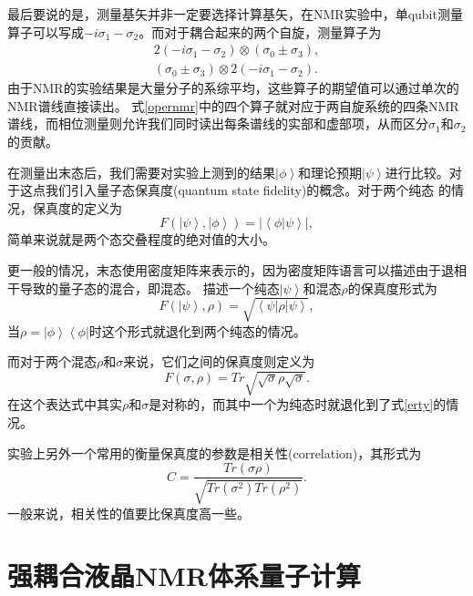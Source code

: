 最后要说的是，测量基矢并非一定要选择计算基矢，在NMR实验中，单qubit测量算子可以写成$-i\sigma_1 - \sigma_2$。而对于耦合起来的两个自旋，测量算子为
\begin{eqnarray}\label{opernmr}
2(-i\sigma_1 - \sigma_2)\otimes (\sigma_0 \pm \sigma_3),\\
(\sigma_0 \pm \sigma_3) \otimes 2(-i\sigma_1 - \sigma_2).
\end{eqnarray}
由于NMR的实验结果是大量分子的系综平均，这些算子的期望值可以通过单次的NMR谱线直接读出。
式\ref{opernmr}中的四个算子就对应于两自旋系统的四条NMR谱线，而相位测量则允许我们同时读出每条谱线的实部和虚部项，从而区分$\sigma_1$和$\sigma_2$的贡献。

在测量出末态后，我们需要对实验上测到的结果$\left \vert \phi \right \rangle$和理论预期$\left \vert \psi \right \rangle$进行比较。对于这点我们引入量子态保真度(quantum state fidelity)的概念。对于两个纯态 的情况，保真度的定义为
\begin{equation}\label{aaa}
F(\left \vert \psi \right \rangle, \left \vert \phi \right \rangle) = |\left \langle \phi | \psi \right \rangle|,
\end{equation}
简单来说就是两个态交叠程度的绝对值的大小。

更一般的情况，末态使用密度矩阵来表示的，因为密度矩阵语言可以描述由于退相干导致的量子态的混合，即混态。
描述一个纯态$\left \vert \psi \right \rangle$和混态$\rho$的保真度形式为
\begin{equation}\label{erty}
F(\left \vert \psi \right \rangle, \rho) = \sqrt{\left \langle \psi \right \vert \rho   \left \vert \psi \right \rangle},
\end{equation}
当$\rho =\left \vert \phi \right \rangle\left \langle \phi \right \vert $时这个形式就退化到两个纯态的情况。

而对于两个混态$\rho$和$\sigma$来说，它们之间的保真度则定义为
\begin{equation}\label{aaa}
F(\sigma, \rho) = Tr \sqrt{\sqrt{\sigma}\rho\sqrt{\sigma}}.
\end{equation}
在这个表达式中其实$\rho$和$\sigma$是对称的，而其中一个为纯态时就退化到了式\ref{erty}的情况。

实验上另外一个常用的衡量保真度的参数是相关性(correlation)，其形式为
\begin{equation}\label{correlation}
C = \frac{Tr(\sigma \rho)}{\sqrt{Tr(\sigma^2)Tr(\rho^2)}}.
\end{equation}
一般来说，相关性的值要比保真度高一些。

\section{强耦合液晶NMR体系量子计算}

